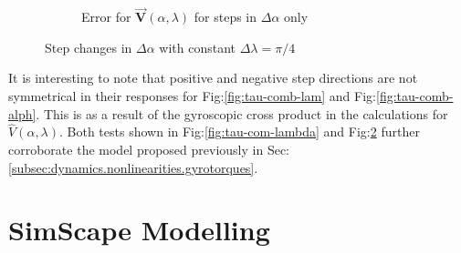 \begin{figure}[htbp]
\begin{subfigure}{0.49\textwidth}
\caption{Error for $\vec{\mathbf{V}}(\alpha,\lambda)$ for steps in $\Delta\alpha$ only}
\label{fig:tau-comb-alph-r}
\end{subfigure}
\vspace{-6pt}
\caption{Step changes in $\Delta\alpha$ with constant $\Delta\lambda=\pi/4$}
\label{fig:tau-comb-alpha}
\vspace{-16pt}
\end{figure}
\par
It is interesting to note that positive and negative step directions are not symmetrical in their responses for Fig:\ref{fig:tau-comb-lam} and Fig:\ref{fig:tau-comb-alph}. This is as a result of the gyroscopic cross product in the calculations for $\hat{V}(\alpha,\lambda)$. Both tests shown in Fig:\ref{fig:tau-com-lambda} and Fig:\ref{fig:tau-comb-alpha} further corroborate the model proposed previously in Sec:\ref{subsec:dynamics.nonlinearities.gyrotorques}.
\newpage
\section{SimScape Modelling}
\label{app:simscape}

